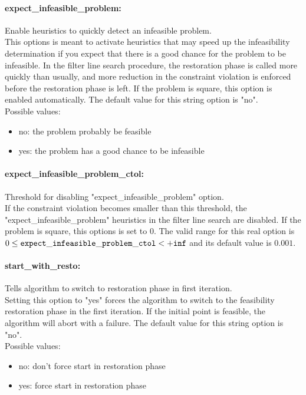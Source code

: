 \paragraph{expect\_infeasible\_problem:}\label{sec:expect_infeasible_problem} Enable heuristics to quickly detect an infeasible problem. $\;$ \\
 This options is meant to activate heuristics that
may speed up the infeasibility determination if
you expect that there is a good chance for the
problem to be infeasible.  In the filter line
search procedure, the restoration phase is called
more quickly than usually, and more reduction in
the constraint violation is enforced before the
restoration phase is left. If the problem is
square, this option is enabled automatically.
The default value for this string option is "no".
\\ 
Possible values:
\begin{itemize}
   \item no: the problem probably be feasible
   \item yes: the problem has a good chance to be infeasible
\end{itemize}

\paragraph{expect\_infeasible\_problem\_ctol:}\label{sec:expect_infeasible_problem_ctol} Threshold for disabling "expect\_infeasible\_problem" option. $\;$ \\
 If the constraint violation becomes smaller than
this threshold, the "expect\_infeasible\_problem"
heuristics in the filter line search are
disabled. If the problem is square, this options
is set to 0. The valid range for this real option is 
$0 \le {\tt expect\_infeasible\_problem\_ctol } <  {\tt +inf}$
and its default value is $0.001$.


\paragraph{start\_with\_resto:}\label{sec:start_with_resto} Tells algorithm to switch to restoration phase in first iteration. $\;$ \\
 Setting this option to "yes" forces the algorithm
to switch to the feasibility restoration phase in
the first iteration. If the initial point is
feasible, the algorithm will abort with a failure.
The default value for this string option is "no".
\\ 
Possible values:
\begin{itemize}
   \item no: don't force start in restoration phase
   \item yes: force start in restoration phase
\end{itemize}

